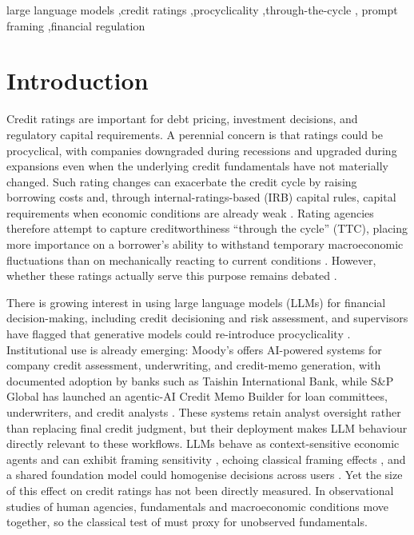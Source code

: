 \documentclass[a4paper,fleqn]{cas-sc}
\begin{document}
\begin{keywords}
large language models \sep credit ratings \sep procyclicality \sep through-the-cycle \sep
prompt framing \sep financial regulation
\end{keywords}

\maketitle

\section{Introduction}\label{sec:intro}
Credit ratings are important for debt pricing, investment decisions, and regulatory capital
requirements. A perennial concern is that ratings could be procyclical, with companies downgraded
during recessions and upgraded during expansions even when the underlying credit fundamentals have not
materially changed. Such rating changes can exacerbate the credit cycle by raising borrowing costs and,
through internal-ratings-based (IRB) capital rules, capital requirements when economic conditions are
already weak \citep{kashyap2004,gordy2006}. Rating agencies therefore attempt to capture
creditworthiness ``through the cycle'' (TTC), placing more importance on a borrower's ability to
withstand temporary macroeconomic fluctuations than on mechanically reacting to current conditions
\citep{amato2004,loffler2004}. However, whether these ratings actually serve this purpose remains
debated \citep{loffler2013}.

There is growing interest in using large language models (LLMs) for financial decision-making,
including credit decisioning and risk assessment, and supervisors have flagged that generative models
could re-introduce procyclicality \citep{bis2024}. Institutional use is already emerging: Moody's offers AI-powered
systems for company credit assessment, underwriting, and credit-memo generation, with documented
adoption by banks such as Taishin International Bank, while S\&P Global has launched an agentic-AI
Credit Memo Builder for loan committees, underwriters, and credit analysts
\citep{moodys2026a,moodys2026b,spglobal2026}. These systems retain analyst oversight rather than
replacing final credit judgment, but their deployment makes LLM behaviour directly relevant to
these workflows. LLMs behave as
context-sensitive economic agents \citep{horton2023} and can exhibit framing sensitivity
\citep{binz2023}, echoing classical framing effects \citep{tversky1981}, and a shared foundation
model could homogenise decisions across users \citep{bommasani2022}. Yet the size of this effect on credit ratings has not
been directly measured. In observational studies of human agencies, fundamentals and macroeconomic
conditions move together, so the classical test of \citet{amato2004} must proxy for unobserved
fundamentals.
\end{document}
